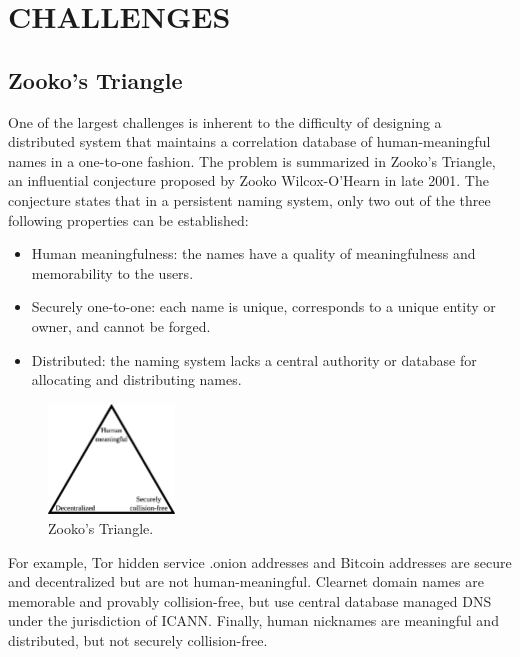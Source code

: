 

\chapter{\uppercase{Challenges}}

\section{Zooko's Triangle}

One of the largest challenges is inherent to the difficulty of designing a distributed system that maintains a correlation database of human-meaningful names in a one-to-one fashion. The problem is summarized in Zooko's Triangle, an influential conjecture proposed by Zooko Wilcox-O'Hearn in late 2001. The conjecture states that in a persistent naming system, only two out of the three following properties can be established:\cite{Ferdous2009}

\begin{itemize}
  \item Human meaningfulness: the names have a quality of meaningfulness and memorability to the users. 
  \item Securely one-to-one: each name is unique, corresponds to a unique entity or owner, and cannot be forged.
  \item Distributed: the naming system lacks a central authority or database for allocating and distributing names.
\end{itemize}

\begin{figure}[htbp]
	\centering
	\includegraphics[width=0.3\textwidth]{images/Zooko.eps}
	\caption{Zooko's Triangle.}
	\label{fig:figure8}
\end{figure}

For example, Tor hidden service .onion addresses and Bitcoin addresses are secure and decentralized but are not human-meaningful. Clearnet domain names are memorable and provably collision-free, but use central database managed DNS under the jurisdiction of ICANN. Finally, human nicknames are meaningful and distributed, but not securely collision-free.\cite{Stiegler2005}

